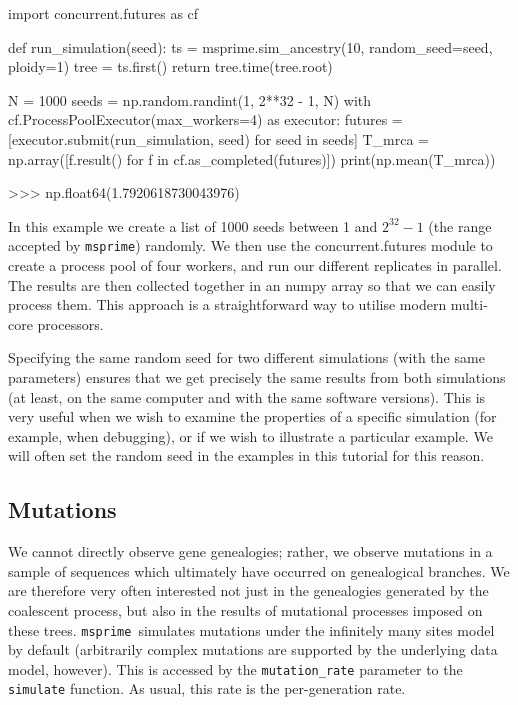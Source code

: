 \documentclass[graybox]{svmult}
\newcommand{\msprime}[0]{\texttt{msprime}}
\begin{document}
\begin{pythoncode}
import concurrent.futures as cf

def run_simulation(seed):
    ts = msprime.sim_ancestry(10, random_seed=seed, ploidy=1)
    tree = ts.first()
    return tree.time(tree.root)

N = 1000
seeds = np.random.randint(1, 2**32 - 1, N)
with cf.ProcessPoolExecutor(max_workers=4) as executor:
     futures = [executor.submit(run_simulation, seed) for seed in seeds]
     T_mrca = np.array([f.result() for f in cf.as_completed(futures)])
print(np.mean(T_mrca))

>>> np.float64(1.7920618730043976)
\end{pythoncode}

    In this example we create a list of 1000 seeds between 1 and $2^{32} -
1$ (the range accepted by \msprime) randomly. We then use the
concurrent.futures module to create a process pool of four workers, and
run our different replicates in parallel. The results are then
collected together in an numpy array so that we can easily process them.
This approach is a straightforward way to utilise modern
multi-core processors.

Specifying the same random seed for two different simulations (with the
same parameters) ensures that we get precisely the same results from
both simulations (at least, on the same computer and with the same
software versions). This is very useful when we wish to examine the
properties of a specific simulation (for example, when debugging), or if
we wish to illustrate a particular example. We will often set the random
seed in the examples in this tutorial for this reason.

\subsection{Mutations}\label{mutations}

We cannot directly observe gene genealogies; rather, we observe mutations in a sample of sequences which ultimately have occurred on genealogical branches. We are
therefore very often interested not just in the genealogies generated by the coalescent process, but also in the results of
mutational processes imposed on these trees. \msprime\ simulates mutations under the infinitely many sites model by default
(arbitrarily complex mutations are supported by the underlying data model, however). This is
accessed by the \texttt{mutation\_rate} parameter to the
\texttt{simulate} function. As usual, this rate is the per-generation
rate.
\end{document}
